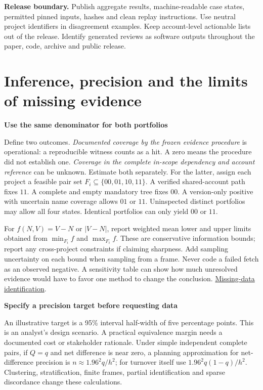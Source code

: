 \documentclass[11pt,a4paper]{article}
\newcommand{\pg}[1]{\newpage\section{\color{ink}#1}}
\newcommand{\hd}[1]{\par\textbf{\color{accent}#1}\par\nopagebreak}
\begin{document}
\textbf{Release boundary.} Publish aggregate results, machine-readable case states, permitted pinned inputs, hashes and clean replay instructions. Use neutral project identifiers in disagreement examples. Keep account-level actionable lists out of the release. Identify generated reviews as software outputs throughout the paper, code, archive and public release.

\pg{Inference, precision and the limits of missing evidence}
\hd{Use the same denominator for both portfolios}
Define two outcomes. \emph{Documented coverage by the frozen evidence procedure} is operational: a reproducible witness counts as a hit. A zero means the procedure did not establish one. \emph{Coverage in the complete in-scope dependency and account reference} can be unknown. Estimate both separately. For the latter, assign each project a feasible pair set $F_i\subseteq\{00,01,10,11\}$. A verified shared-account path fixes $11$. A complete and empty mandatory tree fixes $00$. A version-only positive with uncertain name coverage allows $01$ or $11$. Uninspected distinct portfolios may allow all four states. Identical portfolios can only yield $00$ or $11$.

For $f(N,V)=V-N$ or $|V-N|$, report weighted mean lower and upper limits obtained from $\min_{F_i} f$ and $\max_{F_i} f$. These are conservative information bounds; report any cross-project constraints if claiming sharpness. Add sampling uncertainty on each bound when sampling from a frame. Never code a failed fetch as an observed negative. A sensitivity table can show how much unresolved evidence would have to favor one method to change the conclusion. \href{https://www.sciencedirect.com/science/article/pii/S0888613X04001124}{Missing-data identification}.

\hd{Specify a precision target before requesting data}
An illustrative target is a 95\% interval half-width of five percentage points. This is an analyst's design scenario. A practical equivalence margin needs a documented cost or stakeholder rationale. Under simple independent complete pairs, if $Q=q$ and net difference is near zero, a planning approximation for net-difference precision is $n\approx1.96^2 q/h^2$; for turnover itself use $1.96^2 q(1-q)/h^2$. Clustering, stratification, finite frames, partial identification and sparse discordance change these calculations.
\end{document}
